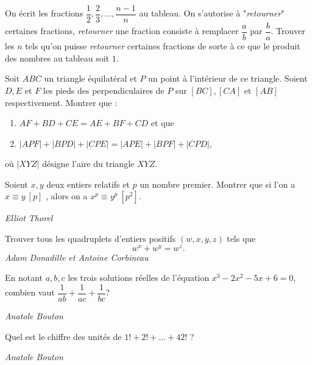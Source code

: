 \begin{exo}{}
On écrit les fractions $\dfrac{1}{2},\dfrac{2}{3},\dots,\dfrac{n-1}{n}$ au tableau. On s'autorise à "\textit{retourner}" certaines fractions, \textit{retourner} une fraction consiste à remplacer $\dfrac{a}{b}$ par $\dfrac{b}{a}$. Trouver les $n$ tels qu'on puisse \textit{retourner} certaines fractions de sorte à ce que le produit des nombres au tableau soit $1$.
\end{exo}


\begin{exo}{}
Soit $ABC$ un triangle équilatéral et $P$ un point à l'intérieur de ce triangle. Soient $D,E$ et $F$ les pieds des perpendiculaires de $P$ sur $[BC],[CA]$ et $[AB]$ respectivement. Montrer que :
\begin{enumerate}
\item $AF+BD+CE=AE+BF+CD$ et que
\item $|APF|+|BPD|+|CPE|=|APE|+|BPF|+|CPD|$,
\end{enumerate}
où $|XYZ|$ désigne l'aire du triangle $XYZ$.
\end{exo}

\begin{exo}{}
Soient $x,y$ deux entiers relatifs et $p$ un nombre premier. Montrer que si l'on a $x\equiv y \ [p]$ , alors on a $x^p\equiv y^p \ [p^2]$.

\medskip
\textit{Elliot Thorel}
\end{exo}

\begin{exo}{}
Trouver tous les quadruplets d'entiers positifs $(w,x,y,z)$ tels que
$$w^x+w^y=w^z.$$
\medskip
\textit{Adam Donadille et Antoine Corbineau}

\end{exo}

\begin{exo}{}
En notant $a,b,c$ les trois solutions réelles de l'équation $x^3-2x^2-5x+6=0$, combien vaut $\dfrac{1}{ab}+\dfrac{1}{ac}+\dfrac{1}{bc}$?

\medskip
\textit{Anatole Bouton}
\end{exo}




\begin{exo}{}
Quel est le chiffre des unités de $1!+2!+\dots+42!$ ?

\medskip
\textit{Anatole Bouton}
\end{exo}


